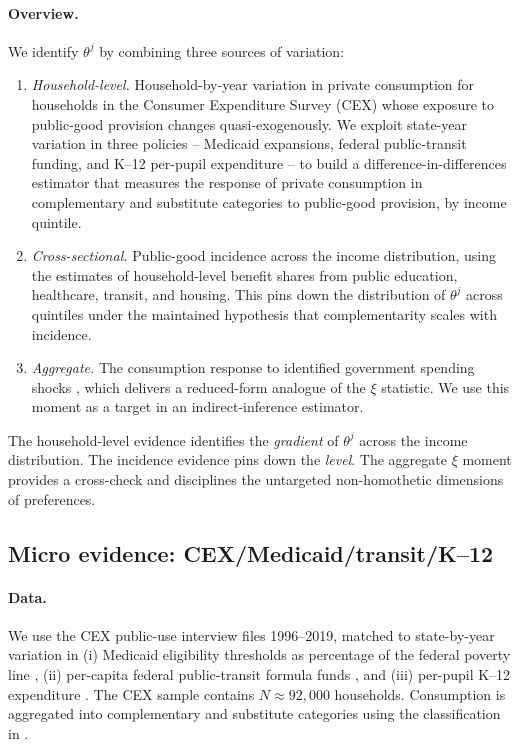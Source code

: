 \paragraph{Overview.}
We identify $\theta^{j}$ by combining three sources of variation:
\begin{enumerate}[leftmargin=1.6em]
  \item \emph{Household-level.} Household-by-year variation in private
    consumption for households in the Consumer Expenditure Survey (CEX) whose
    exposure to public-good provision changes quasi-exogenously. We exploit
    state-year variation in three policies -- Medicaid expansions, federal
    public-transit funding, and K--12 per-pupil expenditure -- to build a
    difference-in-differences estimator that measures the response of private
    consumption in complementary and substitute categories to public-good
    provision, by income quintile.
  \item \emph{Cross-sectional.} Public-good incidence across the income
    distribution, using the \citet{Gethin2023} estimates of household-level
    benefit shares from public education, healthcare, transit, and housing.
    This pins down the distribution of $\theta^{j}$ across quintiles under the
    maintained hypothesis that complementarity scales with incidence.
  \item \emph{Aggregate.} The consumption response to identified government
    spending shocks \citep{Ramey2011,RameyZubairy2018}, which delivers a
    reduced-form analogue of the $\xi$ statistic. We use this moment as a
    target in an indirect-inference estimator.
\end{enumerate}

The household-level evidence identifies the \emph{gradient} of $\theta^{j}$
across the income distribution. The incidence evidence pins down the
\emph{level}. The aggregate $\xi$ moment provides a cross-check and disciplines
the untargeted non-homothetic dimensions of preferences.

\subsection{Micro evidence: CEX/Medicaid/transit/K--12}
\label{subsec:micro-empirical}

\paragraph{Data.}
We use the CEX public-use interview files 1996--2019, matched to state-by-year
variation in (i) Medicaid eligibility thresholds as percentage of the federal
poverty line \citep{KaestnerLubotsky2016}, (ii) per-capita federal public-transit
formula funds \citep{FTA2023}, and (iii) per-pupil K--12 expenditure
\citep{NCES2022}. The CEX sample contains $N\approx 92{,}000$ households.
Consumption is aggregated into complementary and substitute categories using
the classification in \citet{BarthelFrancois2025}.

